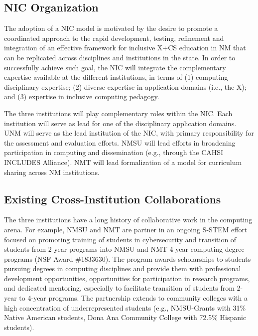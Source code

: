 \subsection{NIC Organization}
 
The adoption of a NIC model is motivated by the desire to promote a coordinated approach to the rapid development, testing, refinement and integration of an effective framework for inclusive X+CS education in NM that can be replicated across disciplines and institutions in the state. In order to successfully achieve such goal, the NIC will integrate the complementary expertise available at the different institutions, in terms of (1) computing disciplinary expertise; (2) diverse expertise in application domains (i.e., the X); and (3) expertise in inclusive computing pedagogy. 

The three institutions will play complementary roles within the NIC. %
Each institution will serve as lead for one of the disciplinary application domains.
UNM will serve as the lead institution of the NIC, with primary responsibility for the assessment and evaluation efforts.
NMSU will lead efforts in broadening participation in computing and dissemination (e.g., through the CAHSI INCLUDES Alliance).
NMT will lead formalization of a model for curriculum sharing across NM institutions. 


\subsection{Existing Cross-Institution Collaborations}
The three institutions have a long history of collaborative work in the computing arena. For example, NMSU and NMT are partner in an ongoing S-STEM effort focused on promoting training of students in cybersecurity and transition of students from 2-year programs into NMSU and NMT 4-year computing degree programs (NSF Award \#1833630). The program awards scholarships to students pursuing degrees in computing disciplines and provide them with professional development opportunities, opportunities for participation in research programs, and dedicated mentoring, especially to facilitate transition of students from 2-year to 4-year programs. The partnership extends to community colleges with a high concentration of underrepresented students (e.g., NMSU-Grants with 31\% Native American students, Dona Ana Community College with 72.5\% Hispanic students).

